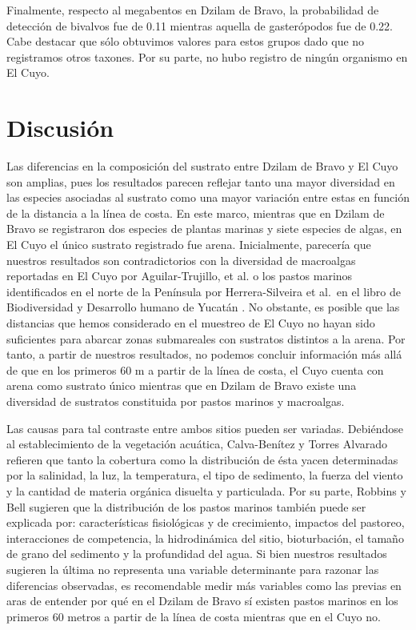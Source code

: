 \documentclass[
  authoryear,
  preprint,
  3p,
  twocolumn]{elsarticle}
\begin{document}
Finalmente, respecto al megabentos en Dzilam de Bravo, la probabilidad
de detección de bivalvos fue de 0.11 mientras aquella de gasterópodos
fue de 0.22. Cabe destacar que sólo obtuvimos valores para estos grupos
dado que no registramos otros taxones. Por su parte, no hubo registro de
ningún organismo en El Cuyo.

\hypertarget{discusiuxf3n}{%
\section{Discusión}\label{discusiuxf3n}}

Las diferencias en la composición del sustrato entre Dzilam de Bravo y
El Cuyo son amplias, pues los resultados parecen reflejar tanto una
mayor diversidad en las especies asociadas al sustrato como una mayor
variación entre estas en función de la distancia a la línea de costa. En
este marco, mientras que en Dzilam de Bravo se registraron dos especies
de plantas marinas y siete especies de algas, en El Cuyo el único
sustrato registrado fue arena. Inicialmente, parecería que nuestros
resultados son contradictorios con la diversidad de macroalgas
reportadas en El Cuyo por Aguilar-Trujillo, et al.
\citep{aguilar2014variacion} o los pastos marinos identificados en el
norte de la Península por Herrera-Silveira et al.~en el libro de
Biodiversidad y Desarrollo humano de Yucatán
\citep{garcia2010biodiversidad}. No obstante, es posible que las
distancias que hemos considerado en el muestreo de El Cuyo no hayan sido
suficientes para abarcar zonas submareales con sustratos distintos a la
arena. Por tanto, a partir de nuestros resultados, no podemos concluir
información más allá de que en los primeros 60 m a partir de la línea de
costa, el Cuyo cuenta con arena como sustrato único mientras que en
Dzilam de Bravo existe una diversidad de sustratos constituida por
pastos marinos y macroalgas.

Las causas para tal contraste entre ambos sitios pueden ser variadas.
Debiéndose al establecimiento de la vegetación acuática, Calva-Benítez y
Torres Alvarado \citep{calva2011carbono} refieren que tanto la cobertura
como la distribución de ésta yacen determinadas por la salinidad, la
luz, la temperatura, el tipo de sedimento, la fuerza del viento y la
cantidad de materia orgánica disuelta y particulada. Por su parte,
Robbins y Bell \citep{robbins2000dynamics} sugieren que la distribución
de los pastos marinos también puede ser explicada por: características
fisiológicas y de crecimiento, impactos del pastoreo, interacciones de
competencia, la hidrodinámica del sitio, bioturbación, el tamaño de
grano del sedimento y la profundidad del agua. Si bien nuestros
resultados sugieren la última no representa una variable determinante
para razonar las diferencias observadas, es recomendable medir más
variables como las previas en aras de entender por qué en el Dzilam de
Bravo sí existen pastos marinos en los primeros 60 metros a partir de la
línea de costa mientras que en el Cuyo no.
\end{document}
